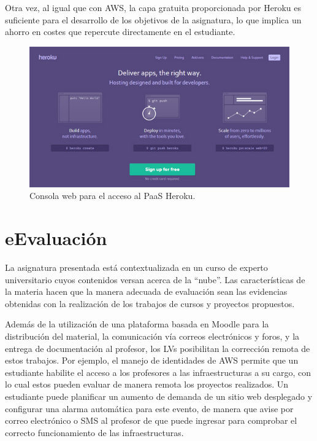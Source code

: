 \documentclass[conference]{IEEEtran}
\begin{document}
Otra vez, al igual que con AWS, la capa gratuita proporcionada por Heroku es suficiente para el desarrollo de los objetivos 
de la asignatura, lo que implica un ahorro en costes que repercute directamente en el estudiante.

\begin{figure}[!t]
\centering
\includegraphics[width=\columnwidth]{heroku.jpeg}
\caption{Consola web para el acceso al PaaS Heroku.}
\label{fig:heroku}
\end{figure}




\section{eEvaluación
\label{sec:eValuacion}}

La asignatura presentada está contextualizada en un curso de experto universitario cuyos contenidos versan acerca de la ``nube''.
Las características de la materia hacen que la manera adecuada de evaluación sean las evidencias obtenidas con la realización de los trabajos de cursos y proyectos propuestos.

Además de la utilización de una plataforma basada en Moodle para la distribución del material, la comunicación vía correos electrónicos y foros, y la entrega de documentación al profesor,
los LVs posibilitan la corrección remota de estos trabajos. Por ejemplo, el manejo de identidades de AWS permite que un estudiante habilite el acceso a los profesores a las infraestructuras a su cargo,
con lo cual estos pueden evaluar de manera remota los proyectos realizados.
Un estudiante puede planificar un aumento de demanda de un sitio web desplegado y configurar una alarma automática para este evento,
de manera que avise por correo electrónico o SMS al profesor de que puede ingresar para 
comprobar el correcto funcionamiento de las infraestructuras.
\end{document}
